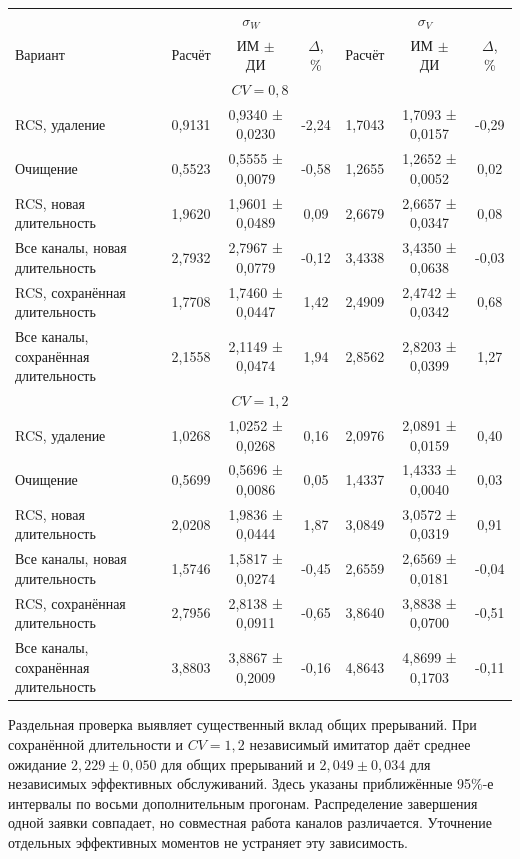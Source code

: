 \setlength{\tabcolsep}{3pt}
\begin{tabular}{p{4.2cm}cccccc}
\toprule
 & \multicolumn{3}{c}{$\sigma_W$} & \multicolumn{3}{c}{$\sigma_V$} \\
Вариант & Расчёт & ИМ $\pm$ ДИ & $\Delta$, \% & Расчёт & ИМ $\pm$ ДИ & $\Delta$, \% \\
\midrule
\multicolumn{7}{c}{$CV=0,8$} \\
RCS, удаление & 0,9131 & 0,9340 ± 0,0230 & -2,24 & 1,7043 & 1,7093 ± 0,0157 & -0,29 \\
Очищение & 0,5523 & 0,5555 ± 0,0079 & -0,58 & 1,2655 & 1,2652 ± 0,0052 & 0,02 \\
RCS, новая длительность & 1,9620 & 1,9601 ± 0,0489 & 0,09 & 2,6679 & 2,6657 ± 0,0347 & 0,08 \\
Все каналы, новая длительность & 2,7932 & 2,7967 ± 0,0779 & -0,12 & 3,4338 & 3,4350 ± 0,0638 & -0,03 \\
RCS, сохранённая длительность & 1,7708 & 1,7460 ± 0,0447 & 1,42 & 2,4909 & 2,4742 ± 0,0342 & 0,68 \\
Все каналы, сохранённая длительность & 2,1558 & 2,1149 ± 0,0474 & 1,94 & 2,8562 & 2,8203 ± 0,0399 & 1,27 \\
\multicolumn{7}{c}{$CV=1,2$} \\
RCS, удаление & 1,0268 & 1,0252 ± 0,0268 & 0,16 & 2,0976 & 2,0891 ± 0,0159 & 0,40 \\
Очищение & 0,5699 & 0,5696 ± 0,0086 & 0,05 & 1,4337 & 1,4333 ± 0,0040 & 0,03 \\
RCS, новая длительность & 2,0208 & 1,9836 ± 0,0444 & 1,87 & 3,0849 & 3,0572 ± 0,0319 & 0,91 \\
Все каналы, новая длительность & 1,5746 & 1,5817 ± 0,0274 & -0,45 & 2,6559 & 2,6569 ± 0,0181 & -0,04 \\
RCS, сохранённая длительность & 2,7956 & 2,8138 ± 0,0911 & -0,65 & 3,8640 & 3,8838 ± 0,0700 & -0,51 \\
Все каналы, сохранённая длительность & 3,8803 & 3,8867 ± 0,2009 & -0,16 & 4,8643 & 4,8699 ± 0,1703 & -0,11 \\
\bottomrule
\end{tabular}





Раздельная проверка выявляет существенный вклад общих прерываний. При сохранённой длительности и \(CV=1{,}2\) независимый имитатор даёт среднее ожидание \(2{,}229\pm0{,}050\) для общих прерываний и \(2{,}049\pm0{,}034\) для независимых эффективных обслуживаний. Здесь указаны приближённые 95\%-е интервалы по восьми дополнительным прогонам. Распределение завершения одной заявки совпадает, но совместная работа каналов различается. Уточнение отдельных эффективных моментов не устраняет эту зависимость.

